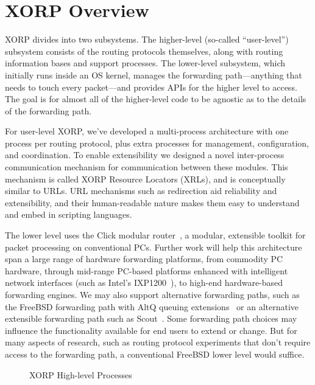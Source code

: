 
\section{XORP Overview}

XORP divides into two subsystems. 
The higher-level (so-called ``user-level'') subsystem
consists of the routing protocols themselves, along with routing
information bases
and support processes. 
The lower-level subsystem, which initially runs inside an OS kernel, manages the
forwarding path---anything that needs to touch every packet---and provides
APIs for the higher level to access.
The goal is for almost all of
the higher-level code to be agnostic as to the details of the
forwarding path.

For user-level XORP, we've developed a multi-process architecture with
one process per routing protocol, plus extra processes for management,
configuration, and coordination.  To enable extensibility we designed
a novel inter-process communication mechanism for communication
between these modules.  This mechanism is called XORP Resource
Locators (XRLs), and is conceptually similar to URLs.  URL mechanisms
such as redirection aid reliability and extensibility, and their
human-readable nature makes them easy to understand and embed in
scripting languages.

The lower level uses the Click modular router~\cite{click}, a
modular, extensible toolkit for packet processing on conventional PCs.
Further work will help this architecture span a
large range of hardware forwarding platforms, from commodity
PC hardware, through mid-range PC-based platforms
enhanced with intelligent network interfaces (such as Intel's
IXP1200~\cite{ixp1200,scoutixp}), to high-end hardware-based forwarding engines.
We may also support alternative forwarding paths, such as the
FreeBSD forwarding path with AltQ queuing extensions~\cite{altq}
or an alternative extensible forwarding path such as
Scout~\cite{pathrouter}.
Some forwarding path choices may influence the functionality available
for end users to extend or change.  But for many aspects of research, such
as routing protocol experiments that don't
require access to the forwarding path, a conventional FreeBSD
lower level would suffice.

\begin{figure}[h]
\centerline{}
\caption{XORP High-level Processes}
\label{fig:processes}
\vspace{-0.1in}
\end{figure}

